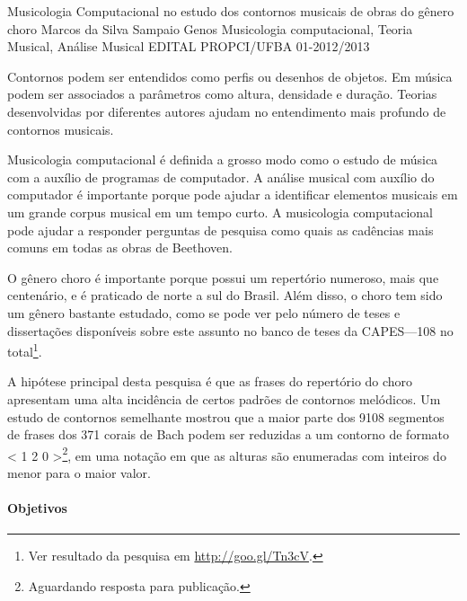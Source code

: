 \documentclass[11pt]{article}
\begin{document}

\dadosProjetoOrientador
{Musicologia Computacional no estudo dos contornos musicais de obras
  do gênero choro}
{Marcos da Silva Sampaio}
{Genos}
{Musicologia computacional, Teoria Musical, Análise Musical}
{EDITAL PROPCI/UFBA 01-2012/2013}

\newpage

\onehalfspace


Contornos podem ser entendidos como perfis ou desenhos de objetos. Em
música podem ser associados a parâmetros como altura, densidade e
duração. Teorias desenvolvidas por diferentes autores
\cite{Friedmann1985,Morris1987,Marvin1988,Bor2009} ajudam no
entendimento mais profundo de contornos musicais.

Musicologia computacional é definida a grosso modo como o estudo de
música com a auxílio de programas de computador. A análise musical com
auxílio do computador é importante porque pode ajudar a identificar
elementos musicais em um grande corpus musical em um tempo curto. A
musicologia computacional pode ajudar a responder perguntas de
pesquisa como quais as cadências mais comuns em todas as obras de
Beethoven.

O gênero choro é importante porque possui um repertório numeroso, mais
que centenário, e é praticado de norte a sul do Brasil. Além disso, o
choro tem sido um gênero bastante estudado, como se pode ver pelo
número de teses e dissertações disponíveis sobre este assunto no banco
de teses da CAPES---108 no total\footnote{Ver resultado da pesquisa em
  \url{http://goo.gl/Tn3cV}.}.

A hipótese principal desta pesquisa é que as frases do repertório do
choro apresentam uma alta incidência de certos padrões de contornos
melódicos. Um estudo de contornos semelhante mostrou que a maior parte
dos 9108 segmentos de frases dos 371 corais de Bach podem ser
reduzidas a um contorno de formato < 1 2 0 >\footnote{Aguardando
  resposta para publicação.}, em uma notação em que as alturas são
enumeradas com inteiros do menor para o maior valor.

\paragraph{Objetivos}
\label{sec:objetivos}
\end{document}
